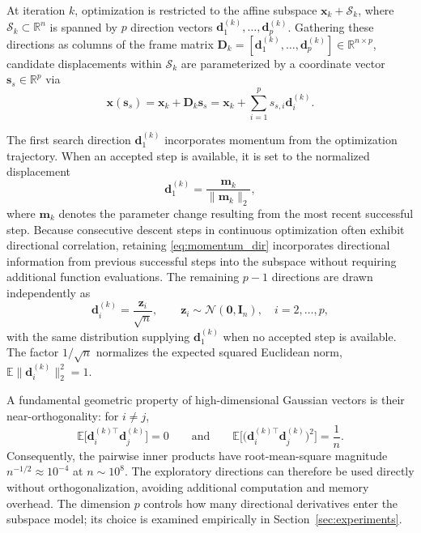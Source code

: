\documentclass[smallextended]{svjour3}
\newcommand{\bx}{\bm{x}}
\newcommand{\bd}{\bm{d}}
\newcommand{\bz}{\bm{z}}
\newcommand{\bs}{\bm{s}}
\begin{document}
At iteration $k$, optimization is restricted to the affine subspace $\bx_k + \mathcal{S}_k$, where $\mathcal{S}_k \subset \mathbb{R}^n$ is spanned by $p$ direction vectors $\bd_1^{(k)}, \ldots, \bd_p^{(k)}$. Gathering these directions as columns of the frame matrix $\bm D_k = [\bd_1^{(k)}, \ldots, \bd_p^{(k)}] \in \mathbb{R}^{n \times p}$, candidate displacements within $\mathcal{S}_k$ are parameterized by a coordinate vector $\bs_s \in \mathbb{R}^p$ via
\begin{equation}
\bx(\bs_s) = \bx_k + \bm D_k \bs_s = \bx_k + \sum_{i=1}^p s_{s,i} \bd_i^{(k)}.
\label{eq:subspace_param}
\end{equation}

The first search direction $\bd_1^{(k)}$ incorporates momentum from the optimization trajectory. When an accepted step is available, it is set to the normalized displacement
\begin{equation}
\bd_1^{(k)} = \frac{\bm m_k}{\|\bm m_k\|_2},
\label{eq:momentum_dir}
\end{equation}
where $\bm m_k$ denotes the parameter change resulting from the most recent successful step. Because consecutive descent steps in continuous optimization often exhibit directional correlation, retaining \eqref{eq:momentum_dir} incorporates directional information from previous successful steps into the subspace without requiring additional function evaluations. The remaining $p-1$ directions are drawn independently as
\begin{equation}
\bd_i^{(k)} = \frac{\bz_i}{\sqrt{n}}, \qquad \bz_i \sim \mathcal{N}(\bm{0}, \bm{I}_n), \quad i = 2, \ldots, p,
\label{eq:random_dirs}
\end{equation}
with the same distribution supplying $\bd_1^{(k)}$ when no accepted step is available. The factor $1/\sqrt{n}$ normalizes the expected squared Euclidean norm, $\mathbb E\|\bd_i^{(k)}\|_2^2 = 1$.

A fundamental geometric property of high-dimensional Gaussian vectors is their near-orthogonality: for $i \ne j$,
\begin{equation}
\mathbb E\bigl[\bd_i^{(k)\top} \bd_j^{(k)}\bigr] = 0
\qquad\text{and}\qquad
\mathbb E\bigl[ \bigl(\bd_i^{(k)\top} \bd_j^{(k)}\bigr)^2 \bigr] = \frac{1}{n}.
\label{eq:near_ortho}
\end{equation}
Consequently, the pairwise inner products have root-mean-square magnitude $n^{-1/2} \approx 10^{-4}$ at $n \sim 10^8$. The exploratory directions can therefore be used directly without orthogonalization, avoiding additional computation and memory overhead. The dimension $p$ controls how many directional derivatives enter the subspace model; its choice is examined empirically in Section~\ref{sec:experiments}.
\end{document}
